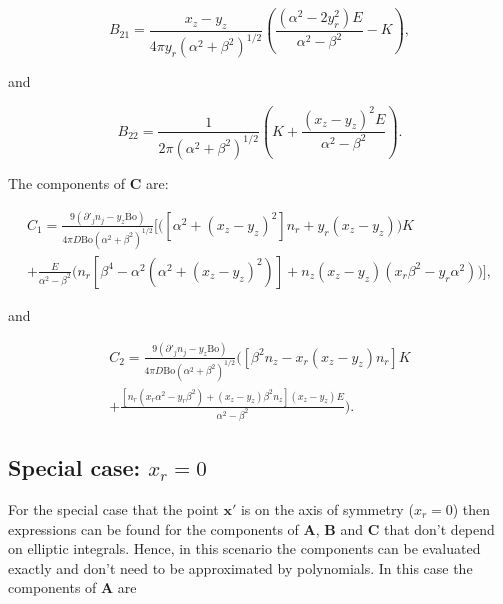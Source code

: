 \documentclass[12pt]{article}
\begin{document}
\begin{equation}
\label{equ:B21_comp}
B_{21} = \frac{x_{z} - y_{z}}{4 \pi y_{r} (\alpha^{2} + \beta^{2})^{1/2}} \left( \frac{(\alpha^{2} - 2 y_{r}^{2}) E}{\alpha^{2} - \beta^{2}} - K\right),
\end{equation}

and 

\begin{equation}
\label{equ:B22_comp}
B_{22} = \frac{1}{2 \pi (\alpha^{2} + \beta^{2})^{1/2}} \left(K + \frac{(x_{z} - y_{z})^{2} E}{\alpha^{2} - \beta^{2}}\right).
\end{equation}

The components of $\boldsymbol{C}$ are:

\begin{align}
\label{equ:C1_comp}
C_{1} = \frac{9 (\partial'_{j} n_{j} - y_{z} \text{Bo})}{4 \pi D \text{Bo} (\alpha^{2} + \beta^{2})^{1/2}} \bigg[ \bigg( [\alpha^{2} + (x_{z} - y_{z})^{2}] n_{r} + y_{r} (x_{z} - y_{z}) \bigg) K \nonumber \\
+ \frac{E}{\alpha^{2} - \beta^{2}} \bigg( n_{r} [\beta^{4} - \alpha^{2} (\alpha^{2} + (x_{z} - y_{z})^{2})] + n_{z} (x_{z} - y_{z}) (x_{r} \beta^{2} - y_{r} \alpha^{2}) \bigg) \bigg],
\end{align}

and 

\begin{align}
\label{equ:C2_comp}
C_{2} = \frac{9 (\partial'_{j} n_{j} - y_{z} \text{Bo})}{4 \pi D \text{Bo} (\alpha^{2} + \beta^{2})^{1/2}}  \bigg( [\beta^{2} n_{z} - x_{r} (x_{z} - y_{z}) n_{r}] K \nonumber \\
+ \frac{[n_{r} (x_{r} \alpha^{2} - y_{r} \beta^{2}) + (x_{z} - y_{z}) \beta^{2} n_{z}] (x_{z} - y_{z}) E}{\alpha^{2} - \beta^{2}}\bigg).
\end{align}

\subsection{Special case: $x_{r} = 0$}
\label{subapp:spec_case}

For the special case that the point $\boldsymbol{x'}$ is on the axis of symmetry ($x_{r} = 0$) then expressions can be found for the components of $\boldsymbol{A}$, $\boldsymbol{B}$ and $\boldsymbol{C}$ that don't depend on elliptic integrals. Hence, in this scenario the components can be evaluated exactly and don't need to be approximated by polynomials. In this case the components of $\boldsymbol{A}$ are
\end{document}
